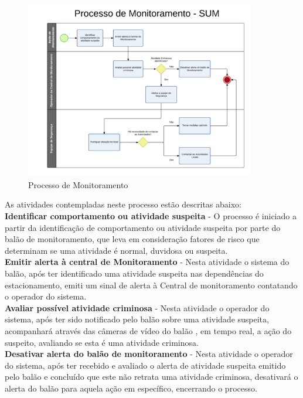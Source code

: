 \begin{figure}[H]
\centering
\includegraphics[width=0.9\textwidth]{figuras/Processodemonitorament}
\caption{Processo de Monitoramento}
\label{img:Processo de Monitoramento}
\end{figure}
As atividades contempladas neste processo estão descritas abaixo:
\\

\textbf{Identificar comportamento ou atividade suspeita} - O processo é iniciado a partir da identificação de comportamento ou atividade suspeita por parte do balão de monitoramento, que leva em consideração fatores de risco que determinam se uma atividade é normal, duvidosa ou suspeita.
\\

\textbf{Emitir alerta à central de Monitoramento} - Nesta atividade o sistema do balão, após ter identificado uma atividade suspeita nas dependências do estacionamento, emiti um sinal de alerta à Central de monitoramento contatando o operador do sistema.
\\

\textbf{Avaliar possível atividade criminosa} - Nesta atividade o operador do sistema, após ter sido notificado pelo balão sobre uma atividade suspeita, acompanhará através das câmeras de vídeo do balão , em tempo real, a ação do suspeito, avaliando se esta é uma atividade criminosa.
\\

\textbf{Desativar alerta do balão de monitoramento} - Nesta atividade o operador do sistema, após ter recebido e avaliado o alerta de atividade suspeita emitido pelo balão e concluído que este não retrata uma atividade criminosa, desativará o alerta do balão para aquela ação em específico, encerrando o processo.
\\

